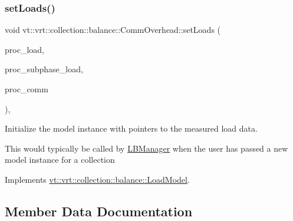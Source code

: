 \subsubsection{\texorpdfstring{set\+Loads()}{setLoads()}}
{\footnotesize\ttfamily void vt\+::vrt\+::collection\+::balance\+::\+Comm\+Overhead\+::set\+Loads (\begin{DoxyParamCaption}\item[{std\+::unordered\+\_\+map$<$ \hyperlink{namespacevt_a46ce6733d5cdbd735d561b7b4029f6d7}{Phase\+Type}, \hyperlink{namespacevt_1_1vrt_1_1collection_1_1balance_a45306ee4bf38fe3fb586d1ee2fa3d147}{Load\+Map\+Type} $>$ const $\ast$}]{proc\+\_\+load,  }\item[{std\+::unordered\+\_\+map$<$ \hyperlink{namespacevt_a46ce6733d5cdbd735d561b7b4029f6d7}{Phase\+Type}, \hyperlink{namespacevt_1_1vrt_1_1collection_1_1balance_a3d91523158c1025b7b665240072f3b7e}{Subphase\+Load\+Map\+Type} $>$ const $\ast$}]{proc\+\_\+subphase\+\_\+load,  }\item[{std\+::unordered\+\_\+map$<$ \hyperlink{namespacevt_a46ce6733d5cdbd735d561b7b4029f6d7}{Phase\+Type}, \hyperlink{namespacevt_1_1vrt_1_1collection_1_1balance_a10860c956804d644db54a16012352728}{Comm\+Map\+Type} $>$ const $\ast$}]{proc\+\_\+comm }\end{DoxyParamCaption})\hspace{0.3cm}{\ttfamily [override]}, {\ttfamily [virtual]}}



Initialize the model instance with pointers to the measured load data. 

This would typically be called by \hyperlink{structvt_1_1vrt_1_1collection_1_1balance_1_1_l_b_manager}{L\+B\+Manager} when the user has passed a new model instance for a collection 

Implements \hyperlink{classvt_1_1vrt_1_1collection_1_1balance_1_1_load_model_a621d040453688c70c168176b40cf90df}{vt\+::vrt\+::collection\+::balance\+::\+Load\+Model}.



\subsection{Member Data Documentation}
\mbox{\label{structvt_1_1vrt_1_1collection_1_1balance_1_1_comm_overhead_a35c4dcc20558f0f5092f9d5ab2e1a662}} 
